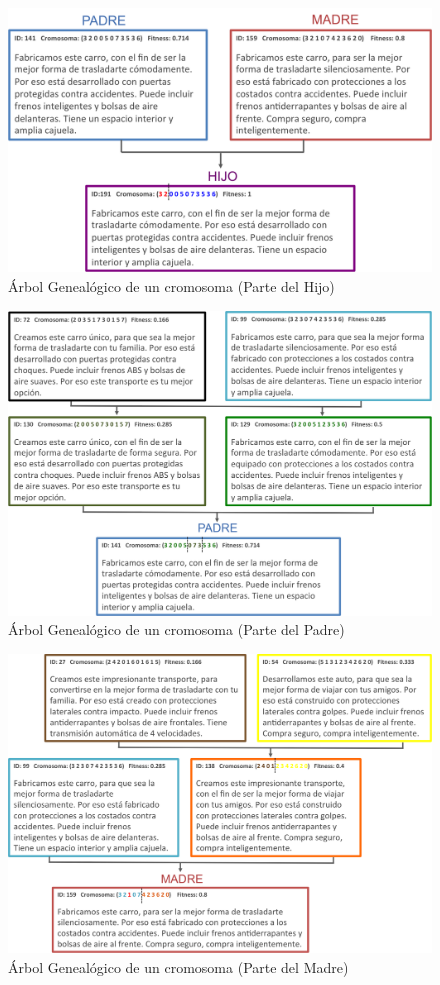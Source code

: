 \chapter{ }

\begin{figure}[htp]
  \centerline{\includegraphics[width=7in]{h.png}} 
  \caption{Árbol Genealógico de un cromosoma (Parte del Hijo)} 
\label{h}
\end{figure}

\begin{figure}[htp]
  \centerline{\includegraphics[width=7in]{p.png}} 
  \caption{Árbol Genealógico de un cromosoma (Parte del Padre)} 
\label{p}
\end{figure}

\begin{figure}[htp]
  \centerline{\includegraphics[width=7in]{m.png}} 
  \caption{Árbol Genealógico de un cromosoma (Parte del Madre)} 
\label{m}
\end{figure}

\clearpage
\newpage

